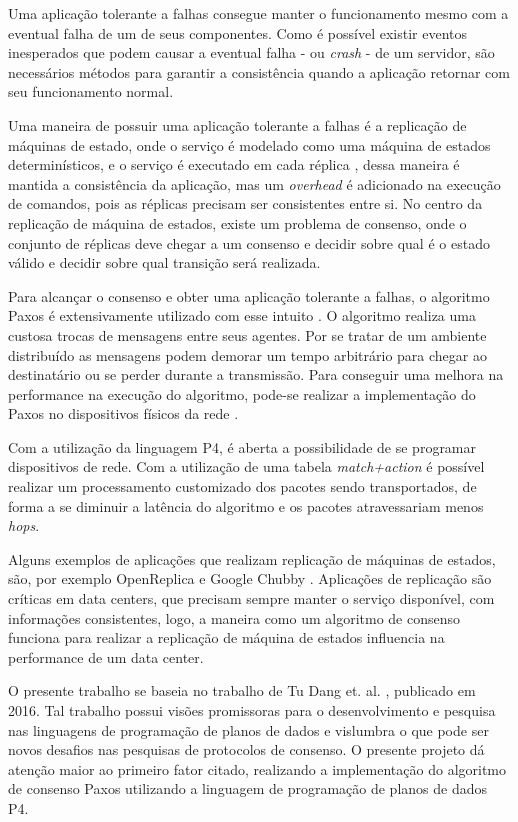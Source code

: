 \documentclass[12pt,
openright, 
oneside,
a4paper,
brazil]{facom-ufu-abntex2}
\theoremstyle{definition}
\begin{document}
Uma aplicação tolerante a falhas consegue manter o funcionamento mesmo com a eventual 
falha de um de seus componentes. Como é possível existir eventos inesperados que podem
causar a eventual falha - ou \textit{crash} - de um servidor, são necessários métodos
para garantir a consistência quando a aplicação retornar com seu funcionamento
normal. 

Uma maneira de possuir uma aplicação tolerante a falhas é a replicação de máquinas
de estado, onde o serviço é modelado como uma máquina de estados determinísticos, e o
serviço é executado em cada réplica \citep{santos2012state}, dessa maneira é mantida
a consistência da aplicação, mas um \textit{overhead} é adicionado na execução
de comandos, pois as réplicas precisam ser consistentes entre si. No centro da replicação
de máquina de estados, existe um problema de consenso, onde o conjunto de réplicas deve 
chegar a um consenso e decidir sobre qual é o estado válido e decidir sobre qual 
transição será realizada. 

Para alcançar o consenso e obter uma aplicação tolerante a falhas, o algoritmo
Paxos é extensivamente utilizado com esse intuito \citep{dang2016paxos}. 
O algoritmo realiza uma custosa trocas de mensagens entre seus agentes. Por se 
tratar de um ambiente distribuído as mensagens podem demorar um tempo arbitrário 
para chegar ao destinatário ou se perder durante a transmissão. Para conseguir 
uma melhora na performance na execução do algoritmo, pode-se realizar a 
implementação do Paxos no dispositivos físicos da rede \citep{dang2016paxos}.

Com a utilização da linguagem P4, é aberta a possibilidade de se programar dispositivos
de rede. Com a utilização de uma tabela \textit{match+action} é possível 
realizar um processamento customizado dos pacotes sendo transportados, de forma a
se diminuir a latência do algoritmo e os pacotes atravessariam menos \textit{hops}.

Alguns exemplos de aplicações que realizam replicação de máquinas de estados, são,
por exemplo OpenReplica \cite{openreplica} e Google Chubby \citep{27897}. Aplicações
de replicação são críticas em data centers, que precisam sempre manter o serviço 
disponível, com informações consistentes, logo, a maneira como um algoritmo de consenso
funciona para realizar a replicação de máquina de estados influencia na performance 
de um data center.

O presente trabalho se baseia no trabalho de Tu Dang et. al. \citep{dang2016paxos}, publicado
em 2016. Tal trabalho possui visões promissoras para o desenvolvimento
e pesquisa nas linguagens de programação de planos de dados e vislumbra o que pode ser
novos desafios nas pesquisas de protocolos de consenso. O presente projeto dá atenção maior
ao primeiro fator citado, realizando a implementação do algoritmo de consenso Paxos utilizando
a linguagem de programação de planos de dados P4.
\end{document}
